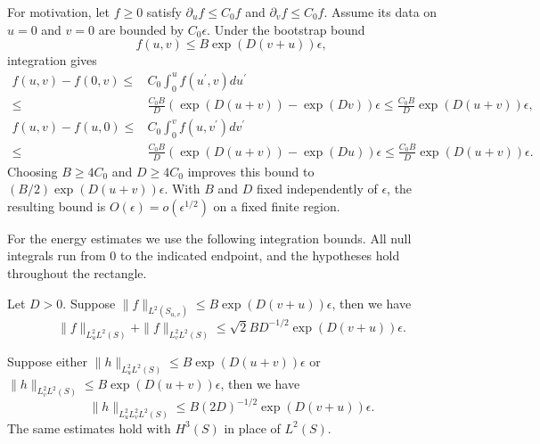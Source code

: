 For motivation, let $f\geq0$ satisfy $\partial_uf\leq C_0f$ and $\partial_vf\leq C_0f$. Assume its data on $u=0$ and $v=0$ are bounded by $C_0\epsilon$. Under the bootstrap bound
$$f(u,v)\leq B\exp(D(v+u))\epsilon,$$ integration gives
\begin{equation*}
    \begin{aligned}
        f(u,v)-f(0,v)\leq&C_0\int_{0}^u f(u^\prime,v) du^\prime\\
        \leq  & \frac{C_0B}{D}\left(\exp(D(u+v))-\exp(Dv)\right)\epsilon \leq \frac{C_0B}{D} \exp(D(u+v))\epsilon,\\
        f(u,v)-f(u,0)\leq & C_0\int_{0}^v f(u,v^\prime) dv^\prime\\
        \leq & \frac{C_0B}{D}\left(\exp(D(u+v))-\exp(Du)\right)\epsilon \leq \frac{C_0B}{D} \exp(D(u+v))\epsilon.
    \end{aligned}
\end{equation*}
Choosing $B\geq4C_0$ and $D\geq4C_0$ improves this bound to $(B/2)\exp(D(u+v))\epsilon$. With $B$ and $D$ fixed independently of $\epsilon$, the resulting bound is $O(\epsilon)=o(\epsilon^{1/2})$ on a fixed finite region.

For the energy estimates we use the following integration bounds. All null integrals run from $0$ to the indicated endpoint, and the hypotheses hold throughout the rectangle.
\begin{lemma}
    Let $D>0$. Suppose $\|f\|_{L^2(S_{u,v})}\leq B\exp(D(v+u))\epsilon$, then we have
    \begin{equation}
        \|f\|_{L^2_uL^2(S)}+\|f\|_{L^2_vL^2(S)} \leq \sqrt{2}BD^{-1/2}\exp(D(v+u))\epsilon.
    \end{equation}

    Suppose either $\|h\|_{L^2_uL^2(S)}\leq B\exp(D(u+v))\epsilon$ or $\|h\|_{L^2_vL^2(S)}\leq B\exp(D(u+v))\epsilon$, then we have    
    \begin{equation}
        \|h\|_{L^2_uL^2_vL^2(S)} \leq B(2D)^{-1/2}\exp(D(v+u))\epsilon.
    \end{equation}
    The same estimates hold with $H^3(S)$ in place of $L^2(S)$.
\end{lemma}

